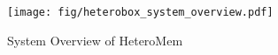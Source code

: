\begin{figure}[t]
  \centering
  \texttt{[image: fig/heterobox\_system\_overview.pdf]}
  \vspace{-0.5cm}
  \caption{System Overview of HeteroMem}
  \vspace{-0.7cm}
  \label{fig:heterobox_system_overview}
\end{figure}
